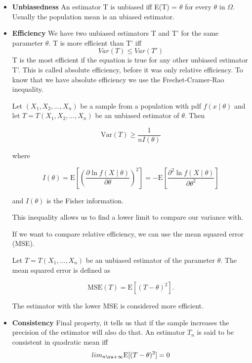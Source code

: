 \begin{itemize}
    \item \textbf{Unbiasedness} \ra An estimator T is unbiased iff E(T) = $\theta$ for every $\theta$ in $\Omega$. Usually the population mean is an ubiased estimator.
    \item \textbf{Efficiency} \ra We have two unbiased estimators T and T' for the same parameter $\theta$. T is more efficient than T' iff
    \begin{equation}
        Var(T) \le Var(T')
    \end{equation}
    T is the most efficient if the equation is true for any other unbiased estimator T'.
    This is called absolute efficiency, before it was only relative efficiency.
    To know that we have absolute efficiency we use the Frechet-Cramer-Rao inequality.

    Let $(X_1, X_2, \dots, X_n)$ be a sample from a population with pdf $f(x \mid \theta)$ and let
$T = T(X_1, X_2, \dots, X_n)$ be an unbiased estimator of $\theta$. Then

\[
\mathrm{Var}(T) \geq \frac{1}{n I(\theta)}
\]

where

\[
I(\theta) = \mathrm{E} \left[ \left( \frac{\partial \ln f(X \mid \theta)}{\partial \theta} \right)^2 \right]
= - \mathrm{E} \left[ \frac{\partial^2 \ln f(X \mid \theta)}{\partial \theta^2} \right]
\]

and $I(\theta)$ is the Fisher information.
\vspace{10pt}

This inequality allows us to find a lower limit to compare our variance with. 

\vspace{10pt}

If we want to compare relative efficiency, we can use the mean squared error (MSE). 

Let $T = T(X_1, \dots, X_n)$ be an unbiased estimator of the parameter $\theta$. The mean squared error is defined as

\begin{equation}
    \mathrm{MSE}(T) = \mathrm{E}[(T - \theta)^2].
\end{equation}

The estimator with the lower MSE is considered more efficient.

\item \textbf{Consistency} \ra Final property, it tells us that if the sample increases the precision of the estimator will also do that. An estimator $T_n$ is said to be consistent in quadratic mean iff 
\begin{equation}
    lim_{n \ra + \infty} \mathrm{E}[(T - \theta)^2] = 0
\end{equation}

\end{itemize}

